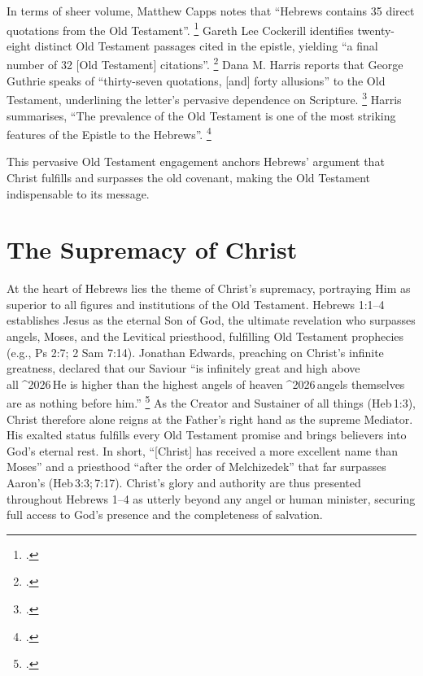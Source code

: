 \documentclass[12pt]{article}
\begin{document}
In terms of sheer volume, Matthew Capps notes that ``Hebrews contains 35 direct
quotations from the Old Testament''. \footcite[10]{Capps2015}
Gareth Lee Cockerill identifies twenty-eight distinct Old Testament passages
cited in the epistle, yielding ``a final number of 32 [Old Testament]
citations''. \footcite[14]{Cockerill2012}
Dana M. Harris reports that George Guthrie speaks of ``thirty-seven quotations,
[and] forty allusions'' to the Old Testament, underlining the letter’s
pervasive dependence on Scripture. \footcite[95]{Harris2021}
Harris summarises, ``The prevalence of the Old Testament is one of the most
striking features of the Epistle to the Hebrews''. \footcite[93]{Harris2021}

This pervasive Old Testament engagement anchors Hebrews’ argument that Christ
fulfills and surpasses the old covenant, making the Old Testament indispensable
to its message.

\section{The Supremacy of Christ}
At the heart of Hebrews lies the theme of Christ’s supremacy, portraying Him as
superior to all figures and institutions of the Old Testament. Hebrews 1:1--4
establishes Jesus as the eternal Son of God, the ultimate revelation who
surpasses angels, Moses, and the Levitical priesthood, fulfilling Old Testament
prophecies (e.g., Ps 2:7; 2 Sam 7:14).
Jonathan Edwards, preaching on Christ’s infinite greatness, declared that our
Saviour ``is infinitely great and high above all^^^^2026 He is higher than the
highest angels of heaven^^^^2026 angels themselves are as nothing before him.''
\footcite[103]{Edwards1981}
As the Creator and Sustainer of all things (Heb 1:3), Christ therefore alone
reigns at the Father’s right hand as the supreme Mediator.
His exalted status fulfills every Old Testament promise and brings believers
into God’s eternal rest.
In short, ``[Christ] has received a more excellent name than Moses'' and a
priesthood ``after the order of Melchizedek'' that far surpasses Aaron’s
(Heb 3:3; 7:17).
Christ’s glory and authority are thus presented throughout Hebrews 1--4 as
utterly beyond any angel or human minister, securing full access to God’s
presence and the completeness of salvation.
\end{document}
